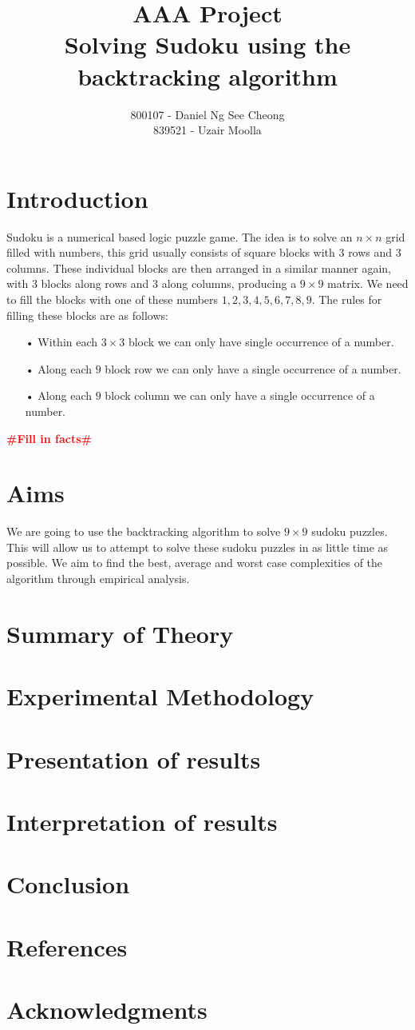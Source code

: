 \documentclass[12pt,a4paper,titlepage]{article}
\author{800107 - Daniel Ng See Cheong\\
		839521 - Uzair Moolla}
\title{
	AAA Project\\
	\large Solving Sudoku using the backtracking algorithm
}
\newcommand{\todo}[1]{\textcolor{red}{\textbf{\##1\#}}}
\begin{document}
\maketitle

\section{Introduction}
Sudoku is a numerical based logic puzzle game. The idea is to solve an $n\times n$ grid filled with numbers, this grid usually consists of square blocks with 3 rows and 3 columns. These individual blocks are then arranged in a similar manner again, with 3 blocks along rows and 3 along columns, producing a $9 \times 9$ matrix.  We need to fill the blocks with one of these numbers ${1,2,3,4,5,6,7,8,9}$. The rules for filling these blocks are as follows:
\begin{itemize}
\item[•] Within each $3 \times 3 $ block we can only have single occurrence of a number.
\item[•] Along each $9$ block row we can only have a single occurrence of a number.
\item[•] Along each $9$ block column we can only have a single occurrence of a number.
\end{itemize}

\todo{Fill in facts}

\section{Aims}

We are going to use the backtracking algorithm to solve $9\times9$ sudoku puzzles. This will allow us to attempt to solve these sudoku puzzles in as little time as possible. We aim to find the best, average and worst case complexities of the algorithm through empirical analysis.

\section{Summary of Theory}

\section{Experimental Methodology}

\section{Presentation of results}

\section{Interpretation of results}

\section{Conclusion}

\section{References}

\section{Acknowledgments}
\end{document}
